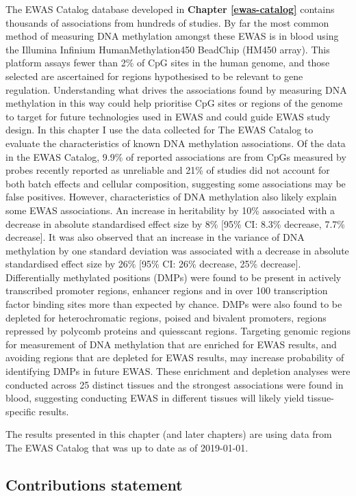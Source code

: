 \documentclass[11pt,oneside]{bristolthesis}
\begin{document}
The EWAS Catalog database developed in \textbf{Chapter \ref{ewas-catalog}} contains thousands of associations from hundreds of studies. By far the most common method of measuring DNA methylation amongst these EWAS is in blood using the Illumina Infinium HumanMethylation450 BeadChip (HM450 array). This platform assays fewer than 2\% of CpG sites in the human genome, and those selected are ascertained for regions hypothesised to be relevant to gene regulation. Understanding what drives the associations found by measuring DNA methylation in this way could help prioritise CpG sites or regions of the genome to target for future technologies used in EWAS and could guide EWAS study design. In this chapter I use the data collected for The EWAS Catalog to evaluate the characteristics of known DNA methylation associations. Of the data in the EWAS Catalog, 9.9\% of reported associations are from CpGs measured by probes recently reported as unreliable and 21\% of studies did not account for both batch effects and cellular composition, suggesting some associations may be false positives. However, characteristics of DNA methylation also likely explain some EWAS associations. An increase in heritability by 10\% associated with a decrease in absolute standardised effect size by 8\% {[}95\% CI: 8.3\% decrease, 7.7\% decrease{]}. It was also observed that an increase in the variance of DNA methylation by one standard deviation was associated with a decrease in absolute standardised effect size by 26\% {[}95\% CI: 26\% decrease, 25\% decrease{]}. Differentially methylated positions (DMPs) were found to be present in actively transcribed promoter regions, enhancer regions and in over 100 transcription factor binding sites more than expected by chance. DMPs were also found to be depleted for heterochromatic regions, poised and bivalent promoters, regions repressed by polycomb proteins and quiesscant regions. Targeting genomic regions for measurement of DNA methylation that are enriched for EWAS results, and avoiding regions that are depleted for EWAS results, may increase probability of identifying DMPs in future EWAS. These enrichment and depletion analyses were conducted across 25 distinct tissues and the strongest associations were found in blood, suggesting conducting EWAS in different tissues will likely yield tissue-specific results.

The results presented in this chapter (and later chapters) are using data from The EWAS Catalog that was up to date as of 2019-01-01.

\hypertarget{contributions-statement-04}{%
\subsection{Contributions statement}\label{contributions-statement-04}}
\end{document}
